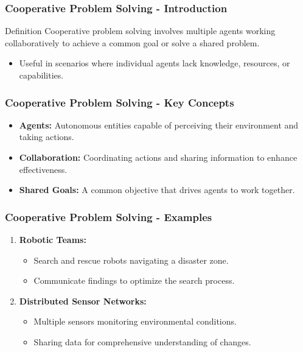 \documentclass[aspectratio=169]{beamer}
\begin{document}
\begin{frame}[fragile]
    \frametitle{Cooperative Problem Solving - Introduction}
    \begin{block}{Definition}
        Cooperative problem solving involves multiple agents working collaboratively to achieve a common goal or solve a shared problem. 
    \end{block}
    \begin{itemize}
        \item Useful in scenarios where individual agents lack knowledge, resources, or capabilities.
    \end{itemize}
\end{frame}

\begin{frame}[fragile]
    \frametitle{Cooperative Problem Solving - Key Concepts}
    \begin{itemize}
        \item \textbf{Agents:} Autonomous entities capable of perceiving their environment and taking actions.
        \item \textbf{Collaboration:} Coordinating actions and sharing information to enhance effectiveness.
        \item \textbf{Shared Goals:} A common objective that drives agents to work together.
    \end{itemize}
\end{frame}

\begin{frame}[fragile]
    \frametitle{Cooperative Problem Solving - Examples}
    \begin{enumerate}
        \item \textbf{Robotic Teams:} 
            \begin{itemize}
                \item Search and rescue robots navigating a disaster zone.
                \item Communicate findings to optimize the search process.
            \end{itemize}
        \item \textbf{Distributed Sensor Networks:} 
            \begin{itemize}
                \item Multiple sensors monitoring environmental conditions.
                \item Sharing data for comprehensive understanding of changes.
            \end{itemize}
    \end{enumerate}
\end{frame}
\end{document}

